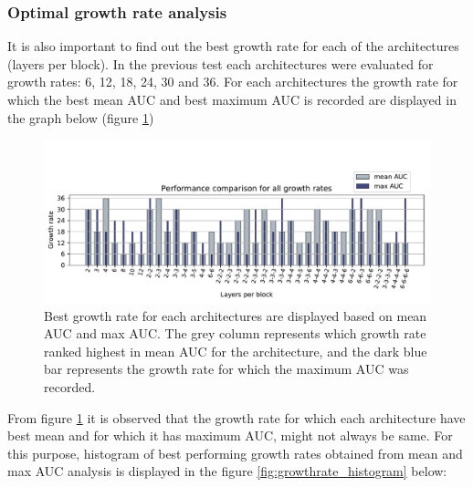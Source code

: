 \subsubsection{Optimal growth rate analysis}
It is also important to find out the best growth rate for each of the architectures (layers per block). In the previous test each architectures were evaluated for growth rates: 6, 12, 18, 24, 30 and 36. 
For each architectures the growth rate for which the best mean AUC and best maximum AUC is recorded are displayed in the graph below (figure \ref{fig:best_growthrate})

\begin{figure}[ht]
\centering
\includegraphics[width=1\textwidth]{images/densenet/siamese/densenet_siamese_gr_all_bar}
\caption[Best growth rate analysis.]{Best growth rate for each architectures are displayed based on mean AUC and max AUC. The grey column represents which growth rate ranked highest in mean AUC for the architecture, 
and the dark blue bar represents the growth rate for which the maximum AUC was recorded.}
\label{fig:best_growthrate}
\end{figure}

From figure \ref{fig:best_growthrate} it is observed that the growth rate for which each architecture have best mean and for which it has maximum AUC, might not always be same. For this purpose, histogram of 
best performing growth rates obtained from mean and max AUC analysis is displayed in the figure \ref{fig:growthrate_histogram} below:

